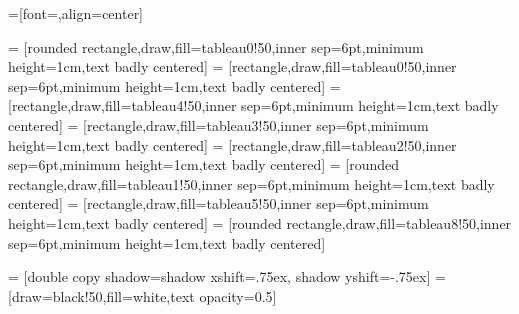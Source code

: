 




=[font=\sffamily,align=center]

 = [rounded rectangle,draw,fill=tableau0!50,inner sep=6pt,minimum height=1cm,text badly centered]
 = [rectangle,draw,fill=tableau0!50,inner sep=6pt,minimum height=1cm,text badly centered]
 = [rectangle,draw,fill=tableau4!50,inner sep=6pt,minimum height=1cm,text badly centered]
 = [rectangle,draw,fill=tableau3!50,inner sep=6pt,minimum height=1cm,text badly centered]
 = [rectangle,draw,fill=tableau2!50,inner sep=6pt,minimum height=1cm,text badly centered]
 = [rounded rectangle,draw,fill=tableau1!50,inner sep=6pt,minimum height=1cm,text badly centered]
 = [rectangle,draw,fill=tableau5!50,inner sep=6pt,minimum height=1cm,text badly centered]
 = [rounded rectangle,draw,fill=tableau8!50,inner sep=6pt,minimum height=1cm,text badly centered]


 = [double copy shadow={shadow xshift=.75ex, shadow yshift=-.75ex}]
 = [draw=black!50,fill=white,text opacity=0.5]

